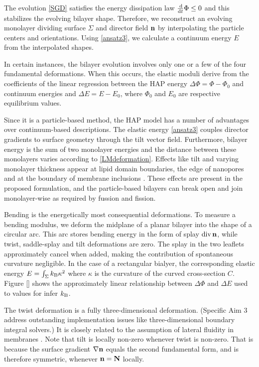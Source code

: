 The evolution \eqref{SGD} satisfies the energy dissipation law $\frac{\dif }{\dif t} \Phi \leq 0$
and this stabilizes the evolving bilayer shape.
Therefore, we reconstruct an evolving monolayer dividing surface $\Sigma$ and director field ${\bf n}$ by
interpolating the particle centers and orientations. Using \eqref{ansatz3}, we calculate a continuum energy $E$ from the interpolated shapes.

In certain instances, the bilayer evolution involves only one or a few of the four fundamental deformations.
When this occurs, the elastic moduli derive from the coefficients of the linear regression between the HAP energy $\Delta \Phi = \Phi - \Phi_0$
and continuum energies and $\Delta E = E - E_0$, where  $\Phi_0$ and $E_0$ are respective equilibrium values.

Since it is a particle-based method, the HAP model has a number of advantages over continuum-based descriptions.
The elastic energy \eqref{ansatz3} couples director gradients to surface geometry through
the tilt vector field.  Furthermore, bilayer energy is the sum of two monolayer
energies and the distance between these monolayers varies according to \eqref{LMdeformation}.
Effects like tilt and varying monolayer thickness appear at lipid domain boundaries, the edge of nanopores and at the boundary of membrane inclusions \cite{PhysRevE.102.042406}.
These effects are present in the proposed formulation, and the particle-based bilayers can break open and join monolayer-wise 
as required by fussion and fission. 

Bending is the energetically most consequential deformations. To measure a bending modulus,  
we deform the midplane of a planar bilayer into the shape of a circular arc.
This arc stores bending energy in the form of splay $\operatorname{div} {\bf n}$, while twist, saddle-splay and tilt deformations are zero.
The splay in the two leaflets approximately cancel when added, making the contribution of spontaneous curvature negligible.
In the case of a rectangular bialyer, the corresponding elastic energy 
$E = \int_{\Sigma} k_{\mathrm{B}} \kappa^2$ where $\kappa$ is the curvature of the curved cross-section $C$.
Figure \ref{} shows the approximately linear relationship between $\Delta \Phi$ and $\Delta E$
used to values for infer $k_{\mathrm{B}}$. 

The twist deformation is a fully three-dimensional deformation. 
(Specific Aim 3 address outstanding implementation issues like three-dimensional boundary integral solvers.) 
It is closely related to the assumption of lateral fluidity in membranes \cite{Hamm2000}. Note that tilt is locally non-zero whenever twist is non-zero.
That is because the surface gradient $\nabla {\bf n}$ equals the second fundamental form, and is therefore symmetric, whenever ${\bf n} = {\bf N}$ locally. 

